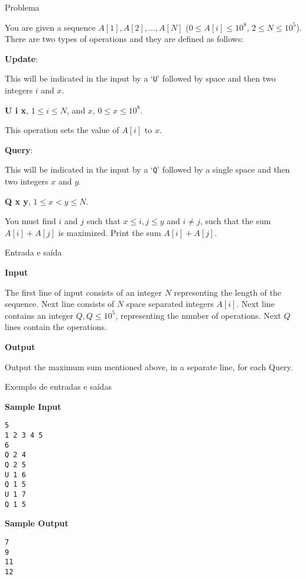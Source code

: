 
\begin{frame}[fragile]{Problema}

You are given a sequence $A[1], A[2], \ldots, A[N]$ ($0 \leq A[i] \leq 10^8$, $2 \leq N \leq 10^5$).
There are two types of operations and they are defined as follows:

\textbf{Update}:

This will be indicated in the input by a `\texttt{U}' followed by space and then two integers 
$i$ and $x$.

\textbf{U i x}, $1 \leq i \leq N$, and $x$, $0 \leq x \leq 10^8$.

This operation sets the value of $A[i]$ to $x$.

\textbf{Query}:

This will be indicated in the input by a `\texttt{Q}' followed by a single space and then two 
integers $x$ and $y$.

\textbf{Q x y}, $1 \leq x < y \leq N$.

You must find $i$ and $j$ such that $x \leq i, j \leq y$ and $i \neq j$, such that the sum 
$A[i]+A[j]$ is maximized. Print the sum $A[i]+A[j]$.

\end{frame}

\begin{frame}[fragile]{Entrada e saída}

\textbf{Input}

The first line of input consists of an integer $N$ representing the length of the sequence. Next 
line consists of $N$ space separated integers $A[i]$. Next line contains an integer 
$Q, Q \leq 10^5$, representing the number of operations. Next $Q$ lines contain the operations.

\textbf{Output}

Output the maximum sum mentioned above, in a separate line, for each Query.

\end{frame}

\begin{frame}[fragile]{Exemplo de entradas e saídas}

\begin{minipage}[t]{0.5\textwidth}
\textbf{Sample Input}
\begin{verbatim}
5
1 2 3 4 5
6
Q 2 4
Q 2 5
U 1 6
Q 1 5
U 1 7
Q 1 5
\end{verbatim}
\end{minipage}
\begin{minipage}[t]{0.45\textwidth}
\textbf{Sample Output}
\begin{verbatim}
7
9
11
12
\end{verbatim}
\end{minipage}
\end{frame}

